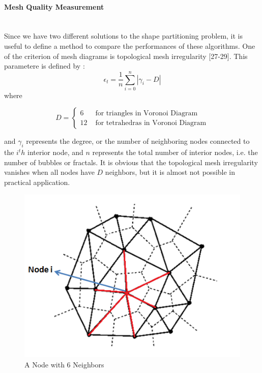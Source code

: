 \documentclass[twoside]{article}
\begin{document}
	
	\paragraph{Mesh Quality Measurement}\hspace{0pt} \\
	Since we have two different solutions to the shape partitioning problem, it is useful to define a method to compare the performances of these algorithms. One of the criterion of mesh diagrams is topological mesh irregularity [27-29]. This parametere is defined by : 
	\begin{equation}
\epsilon _t = \frac{1}{n} \sum_{i = 0}^{n} |\gamma _i - D|
	\end{equation}
	where 
	
	
			\begin{equation}
			D = \left\{ \begin{array}{rl}
			6                               &\mbox{ for triangles in Voronoi Diagram} \\
			12                             &\mbox{ for tetrahedras in Voronoi Diagram}
			\end{array} \right.
			\end{equation}
	
	and $\gamma _i$ represents the degree, or the number of neighboring nodes connected to the $i^th$ interior node, and $n$ represents the total number of interior nodes, i.e. the number of bubbles or fractals. It is obvious that the topological mesh irregularity vanishes when all nodes have $D$ neighbors, but it is almost not possible in practical application. 
	
		\begin{figure}[H]
			\caption{A Node with 6 Neighbors}
			\centering
			\includegraphics[scale = 0.70]{voronoi}
		\end{figure}
\end{document}
